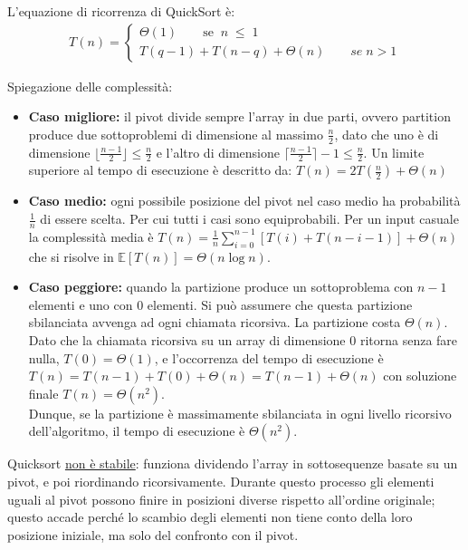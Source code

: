 \documentclass[a4paper, 11pt]{article}
\begin{document}
\noindent L'equazione di ricorrenza di QuickSort è:
\begin{gather*}
    T(n) = 
    \begin{cases}
    \Theta(1)\quad\quad \text{se}\;\; n\; \leq\; 1 \\
    T(q - 1) + T(n - q) + \Theta(n)\quad\quad se\; n > 1
    \end{cases}     
\end{gather*}

\noindent Spiegazione delle complessità:
 
\begin{itemize}

  \item \textbf{Caso migliore:} il pivot divide sempre l'array in due parti, ovvero partition produce due sottoproblemi di dimensione al massimo $\frac{n}{2}$,
   dato che uno è di dimensione $\lfloor \frac{n-1}{2} \rfloor \leq \frac{n}{2}$ e 
   l'altro di dimensione $\lceil \frac{n-1}{2} \rceil - 1 \leq \frac{n}{2}$. 
   Un limite superiore al tempo di esecuzione è descritto da: $T(n) = 2T\left(\frac{n}{2}\right) + \Theta(n)$
  
  \item \textbf{Caso medio:} ogni possibile posizione del pivot nel caso medio ha probabilità $\frac{1}{n}$ di essere scelta. Per cui tutti i casi sono equiprobabili. 
  Per un input casuale la complessità media è $T(n) = \frac{1}{n}\sum_{i=0}^{n-1}\left[T(i) + T(n-i-1)\right] + \Theta(n)$ che si risolve in
   $\mathbb{E}[T(n)] = \Theta(n \log n)$.

  \item \textbf{Caso peggiore:} quando la partizione produce un sottoproblema con $n-1$ elementi e uno con 0 elementi. Si può assumere che questa 
  partizione sbilanciata avvenga ad ogni chiamata ricorsiva. La partizione costa $\Theta(n)$. Dato che la chiamata ricorsiva su un array di dimensione 
  0 ritorna senza fare nulla, $T(0) = \Theta(1)$, 
  e l'occorrenza del tempo di esecuzione è $T(n) = T(n-1) + T(0) + \Theta(n) = T(n-1) + \Theta(n)$ con soluzione finale $T(n) = \Theta(n^2)$.\\ 
  Dunque, se la partizione è massimamente sbilanciata in ogni livello ricorsivo dell'algoritmo, il tempo di esecuzione è $\Theta(n^2)$.

\end{itemize}

\noindent Quicksort \underline{non è stabile}: funziona dividendo l’array in sottosequenze basate su un pivot, e poi riordinando ricorsivamente. 
Durante questo processo gli elementi uguali al pivot possono finire in posizioni diverse rispetto all’ordine originale; questo accade 
perché lo scambio degli elementi non tiene conto della loro posizione iniziale, ma solo del confronto con il pivot.
\end{document}
